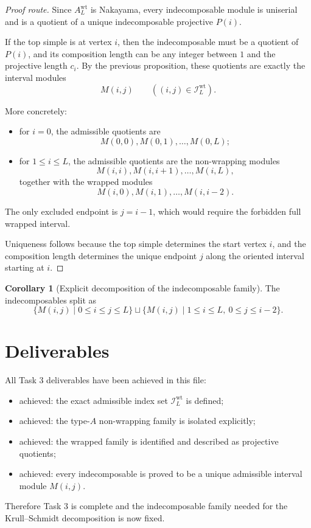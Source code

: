\documentclass{article}
\theoremstyle{definition}
\newtheorem{corollary}[theorem]{Corollary}
\begin{document}
\begin{proof}[Proof route]
Since $A_L^{\mathrm{wt}}$ is Nakayama, every indecomposable module is uniserial
and is a quotient of a unique indecomposable projective $P(i)$.

If the top simple is at vertex $i$, then the indecomposable must be a quotient
of $P(i)$, and its composition length can be any integer between $1$ and the
projective length $c_i$. By the previous proposition, these quotients are
exactly the interval modules
\[
M(i,j)
\qquad
((i,j)\in \mathcal I_L^{\mathrm{wt}}).
\]

More concretely:
\begin{itemize}
\item for $i=0$, the admissible quotients are
  \[
  M(0,0),M(0,1),\dots,M(0,L);
  \]
\item for $1\le i\le L$, the admissible quotients are the non-wrapping modules
  \[
  M(i,i),M(i,i+1),\dots,M(i,L),
  \]
  together with the wrapped modules
  \[
  M(i,0),M(i,1),\dots,M(i,i-2).
  \]
\end{itemize}

The only excluded endpoint is $j=i-1$, which would require the forbidden full
wrapped interval.

Uniqueness follows because the top simple determines the start vertex $i$, and
the composition length determines the unique endpoint $j$ along the oriented
interval starting at $i$.
\end{proof}

\begin{corollary}[Explicit decomposition of the indecomposable family]
The indecomposables split as
\[
\{M(i,j)\mid 0\le i\le j\le L\}
\sqcup
\{M(i,j)\mid 1\le i\le L,\ 0\le j\le i-2\}.
\]
\end{corollary}

\section{Deliverables}

All Task 3 deliverables have been achieved in this file:

\begin{itemize}
\item achieved: the exact admissible index set
  $\mathcal I_L^{\mathrm{wt}}$ is defined;
\item achieved: the type-$A$ non-wrapping family is isolated explicitly;
\item achieved: the wrapped family is identified and described as projective
  quotients;
\item achieved: every indecomposable is proved to be a unique admissible interval
  module $M(i,j)$.
\end{itemize}

Therefore Task 3 is complete and the indecomposable family needed for the
Krull--Schmidt decomposition is now fixed.
\end{document}
